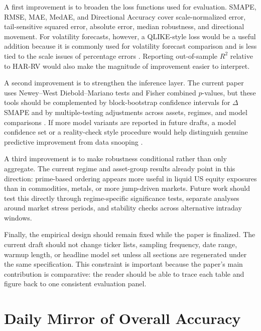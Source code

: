 \documentclass[a4paper]{article}
\renewcommand{\thesection}{\Roman{section}.}
\begin{document}
\noindent
A first improvement is to broaden the loss functions used for evaluation. SMAPE, RMSE, MAE, MedAE, and Directional Accuracy cover scale-normalized error, tail-sensitive squared error, absolute error, median robustness, and directional movement. For volatility forecasts, however, a QLIKE-style loss would be a useful addition because it is commonly used for volatility forecast comparison and is less tied to the scale issues of percentage errors \cite{patton2011}. Reporting out-of-sample $R^2$ relative to HAR-RV would also make the magnitude of improvement easier to interpret.

\noindent
A second improvement is to strengthen the inference layer. The current paper uses Newey--West Diebold--Mariano tests and Fisher combined $p$-values, but these tools should be complemented by block-bootstrap confidence intervals for $\Delta$SMAPE and by multiple-testing adjustments across assets, regimes, and model comparisons \cite{politis1994}. If more model variants are reported in future drafts, a model confidence set or a reality-check style procedure would help distinguish genuine predictive improvement from data snooping \cite{hansen2011,white2000}.

\noindent
A third improvement is to make robustness conditional rather than only aggregate. The current regime and asset-group results already point in this direction: prime-based ordering appears more useful in liquid US equity exposures than in commodities, metals, or more jump-driven markets. Future work should test this directly through regime-specific significance tests, separate analyses around market stress periods, and stability checks across alternative intraday windows.

\noindent
Finally, the empirical design should remain fixed while the paper is finalized. The current draft should not change ticker lists, sampling frequency, date range, warmup length, or headline model set unless all sections are regenerated under the same specification. This constraint is important because the paper's main contribution is comparative: the reader should be able to trace each table and figure back to one consistent evaluation panel.

\newpage
\appendix
\renewcommand{\thesection}{Appendix \Alph{section}}

\section{Daily Mirror of Overall Accuracy}
\end{document}
